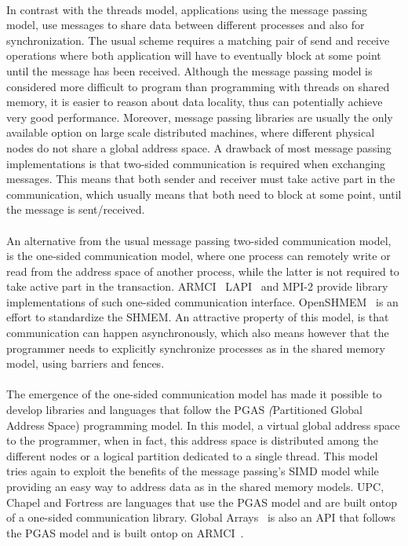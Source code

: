 \paragraph{}
In contrast with the threads model,  applications using the message passing model, use messages to share data
between different processes and also for synchronization.  The usual scheme requires a matching pair
of send and receive operations where both application will have to eventually block at some point until
the message has been received. Although the message passing model is considered more difficult to program 
than programming with threads on shared memory, it is easier to reason about data locality, thus can 
potentially achieve very good performance.  Moreover, message passing libraries are usually the only 
available option on large scale distributed machines, where different physical nodes do not share 
a global address space.  A drawback of most message passing implementations is that two-sided 
communication is required when exchanging messages.  This means that both sender and receiver must
take active part in the communication, which usually means that both need to block at some point,
until the message is sent/received.  

\paragraph{}
An alternative from the usual message passing two-sided communication model, 
is the one-sided communication model, where one process can remotely write
or read from the address space of another process, while the latter is not required 
to take active part in the transaction.  ARMCI~\cite{Nieplocha99armci:a} 
LAPI~\cite{Shah:1998:PEL:876880.879642} and MPI-2 provide library implementations of such 
one-sided communication interface. OpenSHMEM~\cite{Chapman:2010:IOS:2020373.2020375} is 
an effort to standardize the SHMEM. An attractive property of this model, is that communication can happen 
asynchronously, which also means however that the programmer needs to explicitly synchronize
processes as in the shared memory model, using barriers and fences.  

\paragraph{}
The emergence of the one-sided communication model has made it possible to develop libraries and languages
that follow the PGAS \emph(Partitioned Global Address Space) programming model.  In this model,
a virtual global address space to the programmer, when in fact, this address space is 
distributed among the different nodes or a logical partition dedicated to a single thread.  
This model tries again to exploit the benefits of the message passing's SIMD model while providing
an easy way to address data as in the shared memory models.  UPC, Chapel and Fortress are languages
that use the PGAS model and are built ontop of a one-sided communication library.  
Global Arrays~\cite{Nieplocha:2006:AAP:1125980.1125985} is also
an API that follows the PGAS model and is built ontop on ARMCI~\cite{Nieplocha99armci:a}. 

